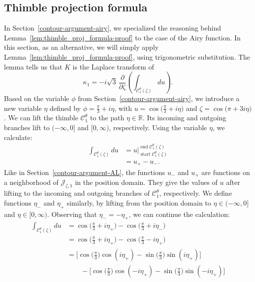 \documentclass{article}
\newcommand{\R}{\mathbb{R}}
\theoremstyle{definition}
\theoremstyle{plain}
\newenvironment{revised}{\color{DarkBlue}}{\color{black}}
\begin{document}
\subsection{Thimble projection formula}\label{thimble-proj-airy}
\begin{revised}
In Section~\ref{contour-argument-airy}, we specialized the reasoning behind Lemma~\ref{lem:thimble_proj_formula-proof} to the case of the Airy function. In this section, as an alternative, we will simply apply Lemma~\ref{lem:thimble_proj_formula-proof}, using trigonometric substitution. The lemma tells us that $K$ is the Laplace transform of
\[ \kappa_1 = -i\sqrt{3}\,\frac{\partial}{\partial \zeta}\left(\int_{\mathcal{C}_1^\theta(\zeta)} du\right). \]
Based on the variable $\phi$ from Section~\ref{contour-argument-airy}, we introduce a new variable $\eta$ defined by $\phi = \tfrac{\pi}{3} + i\eta$, with $u = \cos\big(\tfrac{\pi}{3} + i\eta\big)$ and $\zeta = \cos\big(\pi + 3i\eta\big)$. We can lift the thimble $\mathcal{C}^\theta_1$ to the path $\eta \in \R$. Its incoming and outgoing branches lift to $(-\infty, 0]$ and $[0, \infty)$, respectively. Using the variable $\eta$, we calculate:
\begin{align*}
\int_{\mathcal{C}_1^\theta(\zeta)} du & = u \Big|_{\operatorname{start} \mathcal{C}^\theta_1(\zeta)}^{\operatorname{end} \mathcal{C}^\theta_1(\zeta)} \\
& = u_+ - u_-.
\end{align*}
Like in Section~\ref{contour-argument-AL}, the functions $u_-$ and $u_+$ are functions on a neighborhood of $\mathcal{J}_{\zeta, 1}$ in the position domain. They give the values of $u$ after lifting to the incoming and outgoing branches of $\mathcal{C}^\theta_1$, respectively. We define functions $\eta_-$ and $\eta_+$ similarly, by lifting from the position domain to $\eta \in (-\infty, 0]$ and $\eta \in [0, \infty)$. Observing that $\eta_- = -\eta_+$, we can continue the calculation:
\begin{align*}
\int_{\mathcal{C}_1^\theta(\zeta)} du & = \cos\big(\tfrac{\pi}{3} + i\eta_+\big) - \cos\big(\tfrac{\pi}{3} + i\eta_-\big) \\
& = \cos\big(\tfrac{\pi}{3} + i\eta_+\big) - \cos\big(\tfrac{\pi}{3} - i\eta_+\big) \\
& = \big[\cos\big(\tfrac{\pi}{3}\big) \cos(i\eta_+) - \sin\big(\tfrac{\pi}{3}\big) \sin(i\eta_+)\big] \\
& \qquad - \big[\cos\big(\tfrac{\pi}{3}\big) \cos(-i\eta_+) - \sin\big(\tfrac{\pi}{3}\big) \sin(-i\eta_+)\big] \\

\end{align*}
\end{revised}
\end{document}

